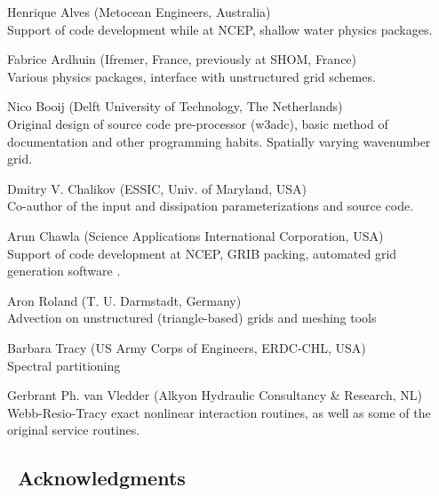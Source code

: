 \begin{list}{\ldots}{ }
\item [Henrique Alves] (Metocean Engineers, Australia) \\
Support of code development while at NCEP, shallow water physics packages.
\item [Fabrice Ardhuin] (Ifremer, France, previously at SHOM, France) \\
Various  physics packages, interface with unstructured grid schemes.
\item [Nico Booij] (Delft University of Technology, The Netherlands) \\
Original design of source code pre-processor ({\code w3adc}), basic method of
documentation and other programming habits. Spatially varying wavenumber grid.
\item [Dmitry V. Chalikov] (ESSIC, Univ. of Maryland, USA) \\ Co-author of the
\cite{tol:JPO96} input and dissipation parameterizations and source code.
\item [Arun Chawla](Science Applications International Corporation, USA) \\
Support of code development at NCEP, GRIB packing, automated grid generation
software \citep{tol:MMAB07a, tol:OMOD08a}.
\item [Aron Roland] (T. U. Darmstadt, Germany) \\
Advection on unstructured (triangle-based) grids and meshing tools
\item [Barbara Tracy] (US Army Corps of Engineers, ERDC-CHL, USA) \\
Spectral partitioning
\item [Gerbrant Ph. van Vledder] (Alkyon Hydraulic Consultancy \& Research,
NL) \\ 
Webb-Resio-Tracy exact nonlinear interaction routines, as well as some of the
original service routines.
\end{list}


\vssub
\subsection{~Acknowledgments}
\vssub

